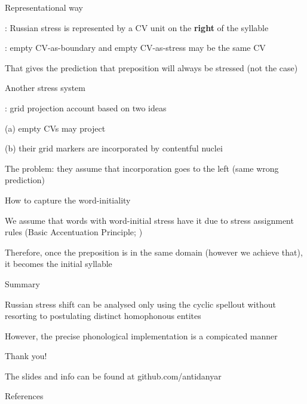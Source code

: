 \documentclass{beamer}
\begin{document}
	\begin{frame}{Representational way}

		\textcite{Enguehard:2016}: Russian stress is represented by a CV unit on the \textbf{right} of the syllable

		\textcite{Enguehard:2014}: empty CV-as-boundary and empty CV-as-stress may be the same CV
		
 		That gives the prediction that preposition will always be stressed (not the case)

	\end{frame}

	\begin{frame}{Another stress system}

		\textcite{Faust:2018}: grid projection account based on two ideas

		(a) empty CVs may project

		(b) their grid markers are incorporated by contentful nuclei

		The problem: they assume that incorporation goes to the left (same wrong prediction)

	\end{frame}

	\begin{frame}{How to capture the word-initiality}

		We assume that words with word-initial stress have it due to stress assignment rules (Basic Accentuation Principle; \cite{Melvold:1989})

	Therefore, once the preposition is in the same domain (however we achieve that), it becomes the initial syllable

	\end{frame}

	\begin{frame}{Summary}

		Russian stress shift can be analysed only using the cyclic spellout without resorting to postulating distinct homophonous entites

		However, the precise phonological implementation is a compicated manner

	\end{frame}

	\begin{frame}

		Thank you!

		The slides and info can be found at github.com/antidanyar

	\end{frame}

	\begin{frame}[allowframebreaks]{References}
		\printbibliography[heading=none]
	\end{frame}
\end{document}
